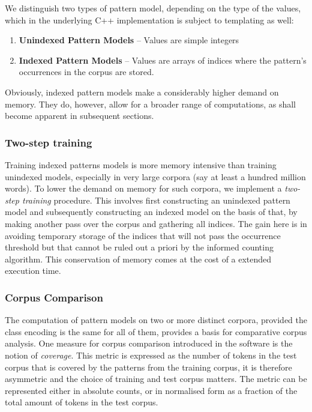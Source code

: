 \documentclass[a4paper,12pt]{article}
\begin{document}
We distinguish two types of pattern model, depending on the type of the values,
which in the underlying C++ implementation is subject to templating as well:

\begin{enumerate}
 \item \textbf{Unindexed Pattern Models} -- Values are simple integers
 \item \textbf{Indexed Pattern Models} -- Values are arrays of indices where
     the pattern's occurrences in the corpus are stored.
\end{enumerate}

Obviously, indexed pattern models make a considerably higher demand on memory.
They do, however, allow for a broader range of computations, as shall become
apparent in subsequent sections.

\subsubsection{Two-step training}

Training indexed patterns models is more memory intensive than training
unindexed models, especially in very large corpora (say at least a hundred
million words). To lower the demand on memory for such corpora, we implement a
\emph{two-step training} procedure. This involves first constructing an
unindexed pattern model and subsequently constructing an indexed model on the
basis of that, by making another pass over the corpus and gathering all
indices. The gain here is in avoiding temporary storage of the indices that
will not pass the occurrence threshold but that cannot be ruled out a priori by the
informed counting algorithm.  This conservation of memory comes at the cost of
a extended execution time.

\subsubsection{Corpus Comparison}

The computation of pattern models on two or more distinct corpora, provided the
class encoding is the same for all of them, provides a basis for comparative
corpus analysis. One measure for corpus comparison introduced in the software
is the notion of \emph{coverage}. This metric is expressed as the number of
tokens in the test corpus that is covered by the patterns from the training
corpus, it is therefore asymmetric and the choice of training and test corpus
matters.  The metric can be represented either in absolute counts, or in
normalised form as a fraction of the total amount of tokens in the test corpus.
\end{document}
